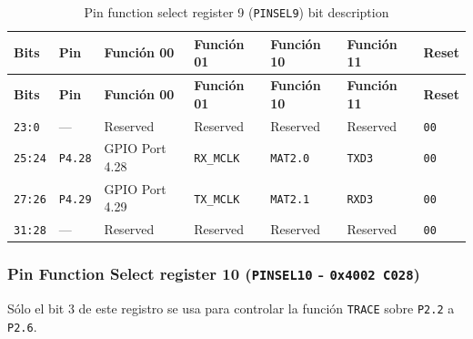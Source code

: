 \begin{longtable}{|>{\raggedright\arraybackslash}p{}|>{\raggedright\arraybackslash}p{}|>{\raggedright\arraybackslash}p{}|>{\raggedright\arraybackslash}p{}|>{\raggedright\arraybackslash}p{}|>{\raggedright\arraybackslash}p{}|>{\centering\arraybackslash}p{}|}
\caption{Pin function select register 9 (\texttt{PINSEL9}) bit description}\\
\hline
\textbf{Bits} & \textbf{Pin} & \textbf{Función 00} & \textbf{Función 01} & \textbf{Función 10} & \textbf{Función 11} & \textbf{Reset} \\
\hline
\endfirsthead
\hline
\textbf{Bits} & \textbf{Pin} & \textbf{Función 00} & \textbf{Función 01} & \textbf{Función 10} & \textbf{Función 11} & \textbf{Reset} \\
\hline
\endhead
\texttt{23:0} & --- & Reserved & Reserved & Reserved & Reserved & \texttt{00} \\
\hline
\texttt{25:24} & \texttt{P4.28} & GPIO Port 4.28 & \texttt{RX\_MCLK} & \texttt{MAT2.0} & \texttt{TXD3} & \texttt{00} \\
\hline
\texttt{27:26} & \texttt{P4.29} & GPIO Port 4.29 & \texttt{TX\_MCLK} & \texttt{MAT2.1} & \texttt{RXD3} & \texttt{00} \\
\hline
\texttt{31:28} & --- & Reserved & Reserved & Reserved & Reserved & \texttt{00} \\
\hline
\end{longtable}

\subsubsection{Pin Function Select register 10 (\texttt{PINSEL10} - \texttt{0x4002 C028})}
Sólo el bit 3 de este registro se usa para controlar la función \texttt{TRACE} sobre \texttt{P2.2} a \texttt{P2.6}.


